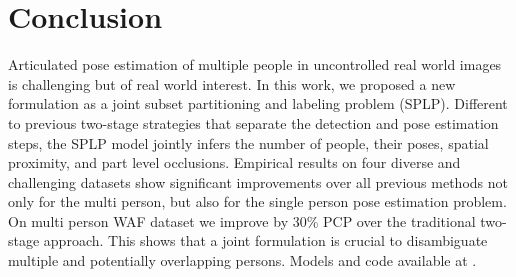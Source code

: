 \section{Conclusion}
Articulated pose estimation of multiple people in uncontrolled real
world images is challenging but of real world interest. In this work,
we proposed a new formulation as a joint subset partitioning and
labeling problem (SPLP). Different to previous two-stage strategies
that separate the detection and pose estimation steps, the SPLP model
jointly infers the number of people, their poses, spatial proximity,
and part level occlusions. Empirical results on four diverse and
challenging datasets show significant improvements over all previous
methods not only for the multi person, but also for the single person
pose estimation problem. On multi person WAF dataset we improve by
$30$\% PCP over the traditional two-stage approach. This shows that a
joint formulation is crucial to disambiguate multiple and potentially
overlapping persons. Models and code available at \myurl.



